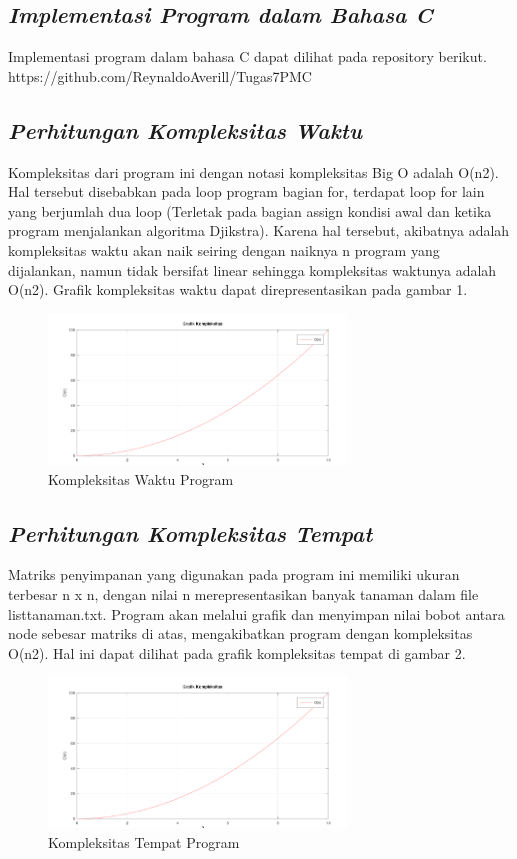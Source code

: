 \documentclass[conference]{IEEEtran}
\begin{document}
\subsection{\textit{Implementasi Program dalam Bahasa C}}
Implementasi program dalam bahasa C dapat dilihat
pada repository berikut. https://github.com/ReynaldoAverill/Tugas7PMC
\subsection{\textit{Perhitungan Kompleksitas Waktu}}
Kompleksitas dari program ini dengan notasi kompleksitas
Big O adalah O(n2). Hal tersebut disebabkan pada loop
program bagian for, terdapat loop for lain yang berjumlah
dua loop (Terletak pada bagian assign kondisi awal dan ketika
program menjalankan algoritma Djikstra). Karena hal tersebut,
akibatnya adalah kompleksitas waktu akan naik seiring dengan
naiknya n program yang dijalankan, namun tidak bersifat
linear sehingga kompleksitas waktunya adalah O(n2). Grafik
kompleksitas waktu dapat direpresentasikan pada gambar 1.
\begin{figure}[htbp]
\centerline{\includegraphics[height=4cm]{fig1.png}}
\caption{Kompleksitas Waktu Program}
\label{fig}
\end{figure}

\subsection{\textit{Perhitungan Kompleksitas Tempat}}
Matriks penyimpanan yang digunakan pada program ini
memiliki ukuran terbesar n x n, dengan nilai n merepresentasikan
banyak tanaman dalam file listtanaman.txt. Program
akan melalui grafik dan menyimpan nilai bobot antara node
sebesar matriks di atas, mengakibatkan program dengan kompleksitas
O(n2). Hal ini dapat dilihat pada grafik kompleksitas
tempat di gambar 2.
\begin{figure}[htbp]
\centerline{\includegraphics[height=4cm]{fig2.png}}
\caption{Kompleksitas Tempat Program}
\label{fig}
\end{figure}
\end{document}
